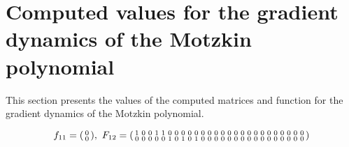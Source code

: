 \documentclass[fleqn]{article}
\begin{document}
\tableofcontents

\section{Computed values for the gradient dynamics of the Motzkin polynomial}
\label{App:Motzkin_values}
This section presents the values of the computed matrices and function for the gradient dynamics of the Motzkin polynomial.

\begin{subequations}
    \begin{equation}
        f_{11} = \spmqty{ 0 \\ 0 },~
        F_{12} = \spmqty{ 1 & 0 & 0 & 1 & 1 & 0 & 0 & 0 & 0 & 0 & 0 & 0 & 0 & 0 & 0 & 0 & 0 & 0 & 0 & 0 & 0 & 0 & 0 & 0 & 0 & 0 \\ 0 & 0 & 0 & 0 & 0 & 1 & 0 & 1 & 0 & 1 & 0 & 0 & 0 & 0 & 0 & 0 & 0 & 0 & 0 & 0 & 0 & 0 & 0 & 0 & 0 & 0 }
    \end{equation}


\end{subequations}
\end{document}

